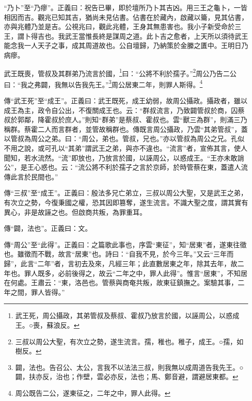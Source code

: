 {\noindent\shu{}\fzkt “乃卜”至“乃瘳”。正義曰：祝告已畢，即於壇所乃卜其吉凶。用三王之龜卜，一皆相因而吉。觀兆已知其吉，猶尚未見佔書。佔書在於藏內，啟藏以籥，見其佔書，亦與兆體乃並是吉。公視兆曰，觀此兆體，王身其無患害也。我小子新受命於三王，謂卜得吉也。我武王當惟長終是謀周之道。此卜吉之愈者，上天所以須待武王能念我一人天子之事，成其周道故也。公自壇歸，乃納策於金縢之匱中。王明日乃病瘳。 \par}

武王既喪，管叔及其群弟乃流言於國，\footnote{武王死，周公攝政，其弟管叔及蔡叔、霍叔乃放言於國，以誣周公，以惑成王。○喪，蘇浪反。}曰：“公將不利於孺子。”\footnote{三叔以周公大聖，有次立之勢，遂生流言。孺，稚也。稚子，成王。○孺，如樹反。}周公乃告二公曰：“我之弗闢，我無以告我先王。”\footnote{闢，法也。告召公、太公，言我不以法法三叔，則我無以成周道告我先王。○闢，扶亦反，治也；作壁，雲必亦反，法也；馬、鄭音避，謂避居東都。}周公居東二年，則罪人斯得。\footnote{周公既告二公，遂東征之，二年之中，罪人此得。}


{\noindent\zhuan{}\fzbyks 傳“武王死”至“成王”。正義曰：武王既死，成王幼弱，故周公攝政。攝政者，雖以成王為主，政令自公出，不復關成王也。云：“群叔流言，乃致闢管叔於商，囚蔡叔於郭鄰，降霍叔於庶人。”則知“群弟”是蔡叔、霍叔也。雲“獸三為群”，則滿三乃稱群。蔡霍二人而言群者，並管故稱群也。傳既言周公攝政，乃雲“其弟管叔”，蓋以管叔為周公之弟。曰：“周公，弟也。管叔，兄也。”亦以管叔為周公之兄。孔似不用之說，或可孔以“其弟”謂武王之弟，與亦不違也。“流言”者，宣佈其言，使人聞知，若水流然。“流”即放也，乃放言於國，以誣周公，以惑成王。“王亦未敢誚公”，是王心惑也。云：“流公將不利於孺子之言於京師，於時管蔡在東，蓋遣人流傳此言於民間也。” \par}

{\noindent\zhuan{}\fzbyks 傳“三叔”至“成王”。正義曰：殷法多兄亡弟立，三叔以周公大聖，又是武王之弟，有次立之勢，今復秉國之權，恐其因即篡奪，遂生流言。不識大聖之度，謂其實有異心，非是故誣之也。但啟商共叛，為罪重耳。 \par}

{\noindent\zhuan{}\fzbyks 傳“闢，法也”。正義曰：文。 \par}

{\noindent\zhuan{}\fzbyks 傳“周公”至“此得”。正義曰：之篇歌此事也，序雲“東征”，知“居東”者，遂東往徵也。雖徵而不戰，故言“居東”也。詩曰：“自我不見，於今三年。”又云“三年而歸”，此言“二年”者，言初去及來，凡經三年；此直數居東之年，除其去年，故二年也。罪人既多，必前後得之，故云“二年之中，罪人此得”。惟言“居東”，不知居在何處。王肅云：“東，洛邑也。管蔡與商奄共叛，故東征鎮撫之。案驗其事，二年之間，罪人皆得。” \par}

